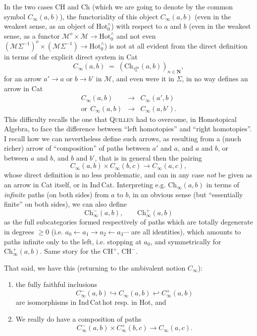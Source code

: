 \documentclass[11pt]{article}
\newcommand{\printedpage}[1]{\marginpar{\footnotesize p.~#1}}
\newcommand{\msp}[1]{\marginpar{\footnotesize [#1]}}
\newcommand{\HotO}{\mathrm{Hot}_0^{\wedge}}
\begin{document}
\msp{page 11}
In the two cases CH and Ch (which we are going to denote by the common symbol $C_{\infty}(a,b)$), the functoriality of this object $C_{\infty}(a,b)$ (even in the weakest sense, as an object of $\HotO$) with respect to $a$ and $b$ (even in the weakest sense, as a functor $\mathcal{M}^o\times\mathcal{M}\longrightarrow\HotO$ and not even $(\mathcal{M}\Sigma^{-1})^o\times(\mathcal{M}\Sigma^{-1})\longrightarrow\HotO$) is not at all evident from the direct definition in terms of the explicit direct system in Cat
\[
C_{\infty}(a,b) \;=\; (\mathrm{Ch}_{\tau_0^{2n}}(a,b))_{n\in\mathbf{N}},
\]
for an arrow $a'\longrightarrow a$ or $b\longrightarrow b'$ in $\mathcal{M}$, and even were it in $\Sigma$, in no way defines an arrow in Cat
\[
\begin{array}{rcl}
C_{\infty}(a,b) & \longrightarrow & C_{\infty}(a',b)\\
\text{or}\ \ C_{\infty}(a,b) & \longrightarrow & C_{\infty}(a,b').
\end{array}
\]
This difficulty recalls the one that \textsc{Quillen} had to overcome, in Homotopical Algebra, to face the difference between ``left homotopies'' and ``right homotopies''. I recall how
\printedpage{8}
\msp{page 12}
we can nevertheless define such arrows, as resulting from a (much richer) arrow of ``composition'' of paths between $a'$ and $a$, and $a$ and $b$, or between $a$ and $b$, and $b$ and $b'$, that is in general then the pairing
\[
C_{\infty}(a,b)\times C_{\infty}(b,c)\longrightarrow C_{\infty}(a,c),
\]
whose direct definition is no less problematic, and can in any case \textit{not} be given as an arrow in Cat itself, or in Ind\,Cat. Interpreting e.g. $\mathrm{Ch}_{\infty}(a,b)$ in terms of \textit{infinite} paths (on both sides) from $a$ to $b$, in an obvious sense (but %
``essentially finite'' on both sides), we can also define %
\[
\mathrm{Ch}^{-}_{\infty}(a,b), \qquad \mathrm{Ch}^{+}_{\infty}(a,b)
\]
as the full subcategories formed respectively of paths which are totally degenerate in degrees $\geq 0$ (i.e. $a_0\longleftarrow a_1\longrightarrow a_2\longleftarrow a_3\cdots$ are all identities), which amounts to paths infinite only to the left, i.e. stopping at $a_0$, and symmetrically for $\mathrm{Ch}^{+}_{\infty}(a,b)$. Same story for the $\mathrm{CH}^{+}$, $\mathrm{CH}^{-}$.

\msp{page 13}
That said, we have this (returning to the ambivalent notion $C_{\infty}$):

\begin{enumerate}
\item[a)] the fully faithful inclusions
\[
C^{-}_{\infty}(a,b)\hookrightarrow C_{\infty}(a,b)\hookleftarrow C^{+}_{\infty}(a,b)
\]
are isomorphisms in Ind\,Cat\,hot resp. in Hot, and
\item[b)] We really do have a composition of paths
\[
C^{-}_{\infty}(a,b)\times C^{+}_{\infty}(b,c)\longrightarrow C_{\infty}(a,c).
\]
\end{enumerate}
\end{document}
